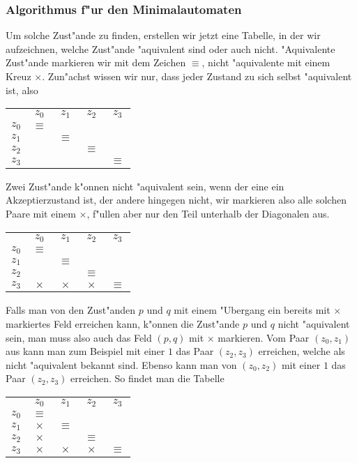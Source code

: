 \subsubsection{Algorithmus f"ur den Minimalautomaten
\label{algorithmus:minimalautomat}}
Um solche Zust"ande zu finden, erstellen wir jetzt eine Tabelle, in der
wir aufzeichnen, welche Zust"ande "aquivalent sind oder auch nicht.
"Aquivalente Zust"ande markieren wir mit dem Zeichen $\equiv$, nicht
"aquivalente mit einem Kreuz $\times$.
Zun"achst wissen wir nur, dass jeder Zustand zu sich selbst "aquivalent
ist, also
\begin{center}
\begin{tabular}{ccccc}
     &$z_0$   &$z_1$   &$z_2$   &$z_3$   \\
$z_0$&$\equiv$&        &        &        \\
$z_1$&        &$\equiv$&        &        \\
$z_2$&        &        &$\equiv$&        \\
$z_3$&        &        &        &$\equiv$
\end{tabular}
\end{center}
Zwei Zust"ande k"onnen nicht "aquivalent sein, wenn der eine
ein Akzeptierzustand ist, der andere hingegen nicht, wir markieren
also alle solchen Paare mit einem $\times$, f"ullen aber nur den Teil unterhalb der
Diagonalen aus.
\begin{center}
\begin{tabular}{ccccc}
     &$z_0$   &$z_1$   &$z_2$   &$z_3$   \\
$z_0$&$\equiv$&        &        &        \\
$z_1$&        &$\equiv$&        &        \\
$z_2$&        &        &$\equiv$&        \\
$z_3$&$\times$&$\times$&$\times$&$\equiv$
\end{tabular}
\end{center}
Falls man von den Zust"anden $p$ und $q$ mit einem "Ubergang
ein bereits mit $\times$ markiertes Feld erreichen kann, k"onnen die
Zust"ande $p$ und $q$ nicht "aquivalent sein, man muss also auch das
Feld $(p,q)$ mit $\times$ markieren.
Vom Paar $(z_0,z_1)$ aus kann man zum Beispiel mit einer $1$ das
Paar $(z_2,z_3)$ erreichen, welche als nicht "aquivalent bekannt
sind. Ebenso kann man von $(z_0,z_2)$ mit einer $1$ das Paar
$(z_2,z_3)$ erreichen. So findet man die Tabelle
\begin{center}
\begin{tabular}{ccccc}
     &$z_0$   &$z_1$   &$z_2$   &$z_3$   \\
$z_0$&$\equiv$&        &        &        \\
$z_1$&$\times$&$\equiv$&        &        \\
$z_2$&$\times$&        &$\equiv$&        \\
$z_3$&$\times$&$\times$&$\times$&$\equiv$
\end{tabular}
\end{center}
